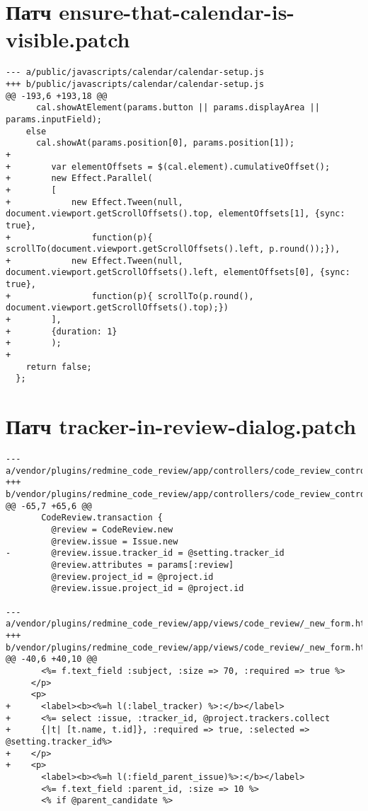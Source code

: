 \section{Патч ensure-that-calendar-is-visible.patch}
\label{appendix:ensure-that-calendar-is-visible.patch}
\small{\begin{lstlisting}
--- a/public/javascripts/calendar/calendar-setup.js
+++ b/public/javascripts/calendar/calendar-setup.js
@@ -193,6 +193,18 @@
      cal.showAtElement(params.button || params.displayArea || params.inputField);
    else
      cal.showAt(params.position[0], params.position[1]);
+
+        var elementOffsets = $(cal.element).cumulativeOffset();
+        new Effect.Parallel(
+        [
+            new Effect.Tween(null, document.viewport.getScrollOffsets().top, elementOffsets[1], {sync: true},
+                function(p){ scrollTo(document.viewport.getScrollOffsets().left, p.round());}),
+            new Effect.Tween(null, document.viewport.getScrollOffsets().left, elementOffsets[0], {sync: true},
+                function(p){ scrollTo(p.round(), document.viewport.getScrollOffsets().top);})
+        ],
+        {duration: 1}
+        );
+
    return false;
  };
\end{lstlisting}}

\section{Патч tracker-in-review-dialog.patch}
\label{appendix:tracker-in-review-dialog.patch}
\small{\begin{lstlisting}
--- a/vendor/plugins/redmine_code_review/app/controllers/code_review_controller.rb
+++ b/vendor/plugins/redmine_code_review/app/controllers/code_review_controller.rb
@@ -65,7 +65,6 @@
       CodeReview.transaction {
         @review = CodeReview.new
         @review.issue = Issue.new
-        @review.issue.tracker_id = @setting.tracker_id
         @review.attributes = params[:review]
         @review.project_id = @project.id
         @review.issue.project_id = @project.id
         
--- a/vendor/plugins/redmine_code_review/app/views/code_review/_new_form.html.erb
+++ b/vendor/plugins/redmine_code_review/app/views/code_review/_new_form.html.erb
@@ -40,6 +40,10 @@
       <%= f.text_field :subject, :size => 70, :required => true %>
     </p>
     <p>
+      <label><b><%=h l(:label_tracker) %>:</b></label>
+      <%= select :issue, :tracker_id, @project.trackers.collect 
+      {|t| [t.name, t.id]}, :required => true, :selected => @setting.tracker_id%>
+    </p>
+    <p>
       <label><b><%=h l(:field_parent_issue)%>:</b></label>
       <%= f.text_field :parent_id, :size => 10 %>
       <% if @parent_candidate %>
\end{lstlisting}}

